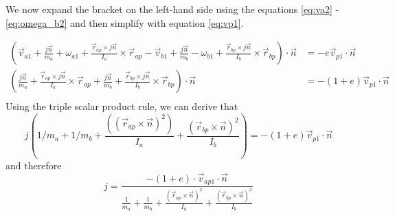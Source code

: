 We now expand the bracket on the left-hand side using the equations \ref{eq:va2}
- \ref{eq:omega_b2} and then simplify with equation \ref{eq:vp1}.

\[
	\begin{split}
		\left( \vec v_{a1} +  \frac{j\vec n}{m_a} + \omega_{a1} + \frac{\vec r_{ap} \times j\vec n}{I_a} \times \vec r_{ap} - \vec v_{b1} +  \frac{j\vec n}{m_b} - \omega_{b1} + \frac{\vec r_{bp} \times j\vec n}{I_b} \times \vec r_{bp} \right)\cdot \vec n &= - e \vec v_{p1} \cdot \vec n\\
		\left( \frac{j\vec n}{m_a} + \frac{\vec r_{ap} \times j\vec n}{I_a} \times \vec r_{ap} +  \frac{j\vec n}{m_b} + \frac{\vec r_{bp} \times j\vec n}{I_b} \times \vec r_{bp} \right)\cdot \vec n &= - (1+e) \vec v_{p1} \cdot \vec n\\
	\end{split}
\]
Using the triple scalar product rule, we can derive that
\[
	j \left( 1/m_a + 1/m_b + \frac{\left(( \vec r_{ap} \times \vec n
			)^2\right)}{I_a} + \frac{\left( \vec r_{bp} \times \vec n \right)^2}{I_b}
	\right) = -(1+e) \vec v_{p1} \cdot \vec n
\]
and therefore
\begin{equation}
	j = \frac{ - (1+e) \cdot \vec v_{ap1} \cdot \vec n }{\frac{1}{m_a} + \frac{1}{m_b} +
		\frac{\left( \vec r_{ap} \times \vec n \right)^2}{I_a} + \frac{\left( \vec
			r_{bp} \times \vec n \right)^2}{I_b}}
\end{equation}
